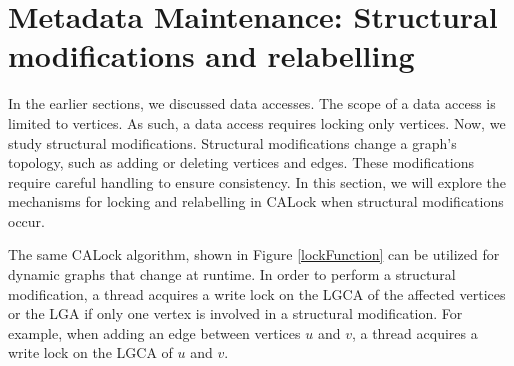 \section{Metadata Maintenance: Structural modifications and relabelling}

In the earlier sections, we discussed data accesses. The scope of a data access is limited to vertices. As such, a data access requires locking only vertices. Now, we study structural modifications. Structural modifications change a graph's topology, such as adding or deleting vertices and edges. These modifications require careful handling to ensure consistency. In this section, we will explore the mechanisms for locking and relabelling in CALock when structural modifications occur.

The same CALock algorithm, shown in Figure \ref{lockFunction} can be utilized for dynamic graphs that change at runtime. 
In order to perform a structural modification, a thread acquires a write lock on the LGCA of the affected vertices or the LGA if only one vertex is involved in a structural modification. For example, when adding an edge between vertices $u$ and $v$, a thread acquires a write lock on the LGCA of $u$ and $v$. 



